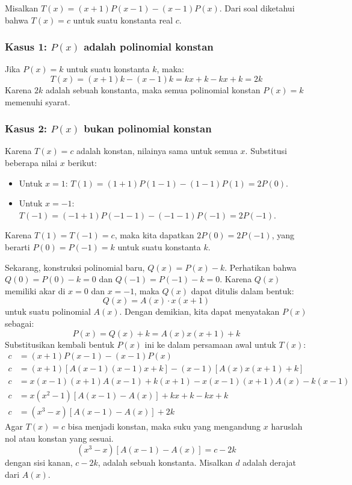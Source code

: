 

\begin{solusi}
    Misalkan $T(x) = (x+1)P(x-1) - (x-1)P(x)$. Dari soal diketahui bahwa $T(x)=c$ untuk suatu konstanta real $c$.

    \subsubsection*{Kasus 1: $P(x)$ adalah polinomial konstan}
    Jika $P(x) = k$ untuk suatu konstanta $k$, maka:
    \[ T(x) = (x+1)k - (x-1)k = kx + k - kx + k = 2k \]
    Karena $2k$ adalah sebuah konstanta, maka semua polinomial konstan $P(x)=k$ memenuhi syarat.
    
    \subsubsection*{Kasus 2: $P(x)$ bukan polinomial konstan}
    Karena $T(x)=c$ adalah konstan, nilainya sama untuk semua $x$. Substitusi beberapa nilai $x$ berikut:
    \begin{itemize}
        \item Untuk $x=1$: \quad $T(1) = (1+1)P(1-1) - (1-1)P(1) = 2P(0)$.
        \item Untuk $x=-1$: \quad $T(-1) = (-1+1)P(-1-1) - (-1-1)P(-1) = 2P(-1)$.
    \end{itemize}
    Karena $T(1) = T(-1) = c$, maka kita dapatkan $2P(0) = 2P(-1)$, yang berarti $P(0) = P(-1) = k$ untuk suatu konstanta $k$.
    
    Sekarang, konstruksi polinomial baru, $Q(x) = P(x) - k$.
    Perhatikan bahwa $Q(0) = P(0) - k = 0$ dan $Q(-1) = P(-1) - k = 0$.
    Karena $Q(x)$ memiliki akar di $x=0$ dan $x=-1$, maka $Q(x)$ dapat ditulis dalam bentuk:
    \[ Q(x) = A(x) \cdot x(x+1) \]
    untuk suatu polinomial $A(x)$. Dengan demikian, kita dapat menyatakan $P(x)$ sebagai:
    \[ P(x) = Q(x) + k = A(x)x(x+1) + k \]
    Substitusikan kembali bentuk $P(x)$ ini ke dalam persamaan awal untuk $T(x)$:
    \begin{align*}
        c &= (x+1)P(x-1) - (x-1)P(x) \\
        c &= (x+1)\left[ A(x-1)(x-1)x + k \right] - (x-1)\left[ A(x)x(x+1) + k \right] \\
        c &= x(x-1)(x+1)A(x-1) + k(x+1) - x(x-1)(x+1)A(x) - k(x-1) \\
        c &= x(x^2-1) \left[ A(x-1) - A(x) \right] + kx + k - kx + k \\
        c &= (x^3-x) \left[ A(x-1) - A(x) \right] + 2k
    \end{align*}
    Agar $T(x)=c$ bisa menjadi konstan, maka suku yang mengandung $x$ haruslah nol atau konstan yang sesuai.
    \[ (x^3-x) \left[ A(x-1) - A(x) \right] = c - 2k \]
    dengan sisi kanan, $c-2k$, adalah sebuah konstanta. Misalkan $d$ adalah derajat dari $A(x)$.
    

\end{solusi}
